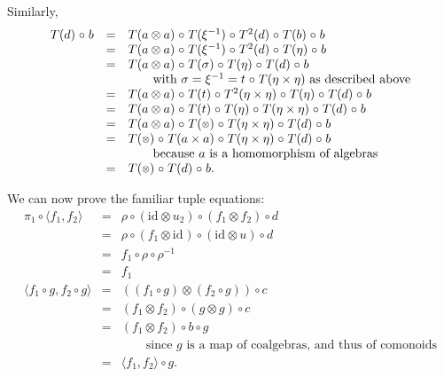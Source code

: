 \documentclass{LMCS}
\newcommand{\after}{\mathrel{\circ}}
\newcommand{\idmap}[1][]{\ensuremath{\mathrm{id}_{#1}}}
\newcommand{\sotimes}{\mathrel{\raisebox{.05pc}{$\scriptstyle \otimes$}}}
\newcommand{\tuple}[1]{\ensuremath{\langle #1 \rangle}}
\begin{document}
{\noindent Similarly,
$$\begin{array}{rcl}
T(d) \after b
& = &
T(a\otimes a) \after T(\xi^{-1}) \after T^{2}(d) \after T(b) \after b \\
& = &
T(a\otimes a) \after T(\xi^{-1}) \after T^{2}(d) \after T(\eta) \after b \\
& = &
T(a\otimes a) \after T(\sigma) \after T(\eta) \after T(d) \after b \\
& & \qquad \mbox{with } \sigma = \xi^{-1} = t \after T(\eta\times\eta)
   \mbox{ as described above} \\
& = &
T(a\otimes a) \after T(t) \after T^{2}(\eta\times\eta) \after T(\eta) \after 
   T(d) \after b \\
& = &
T(a\otimes a) \after T(t) \after T(\eta) \after T(\eta\times\eta) \after 
   T(d) \after b \\
& = &
T(a\otimes a) \after T(\sotimes) \after T(\eta\times\eta) \after 
   T(d) \after b \\
& = &
T(\sotimes) \after T(a\times a) \after T(\eta\times\eta) \after 
   T(d) \after b \\
& & \qquad\mbox{because $a$ is a homomorphism of algebras} \\
& = &
T(\sotimes) \after T(d) \after b.
\end{array}$$

We can now prove the familiar tuple equations:
$$\begin{array}{rcl}
\pi_{1} \after \tuple{f_{1}, f_{2}}
& = &
\rho \after (\idmap\otimes u_{2}) \after (f_{1}\otimes f_{2}) \after d \\
& = &
\rho \after (f_{1}\otimes\idmap) \after (\idmap\otimes u) \after d \\
& = &
f_{1} \after \rho \after \rho^{-1} \\
& = &
f_{1} \\
\tuple{f_{1} \after g, f_{2} \after g}
& = &
((f_{1} \after g) \otimes (f_{2} \after g)) \after c \\
& = &
(f_{1}\otimes f_{2}) \after (g\otimes g) \after c \\
& = &
(f_{1}\otimes f_{2}) \after b \after g \\
& & \qquad \mbox{since $g$ is a map of coalgebras, and thus of comonoids} \\
& = &
\tuple{f_{1}, f_{2}} \after g.
\end{array}$$

}
\end{document}

